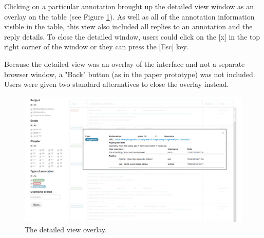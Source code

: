 Clicking on a particular annotation brought up the detailed view window as an overlay on the table (see Figure \ref{fig:detailedview}). As well as all of the annotation information visible in the table, this view also included all replies to an annotation and the reply details. To close the detailed window, users could click on the [x] in the top right corner of the window or they can press the [Esc] key. 

Because the detailed view was an overlay of the interface and not a separate browser window, a "Back" button (as in the paper prototype) was not included. Users were given two standard alternatives to close the overlay instead. 

\begin{figure}[h!]
    \centering
    \includegraphics[width=\textwidth]{Figures/V1/detailedview.png}
 \caption{The detailed view overlay.}
 \label{fig:detailedview}

\end{figure}

